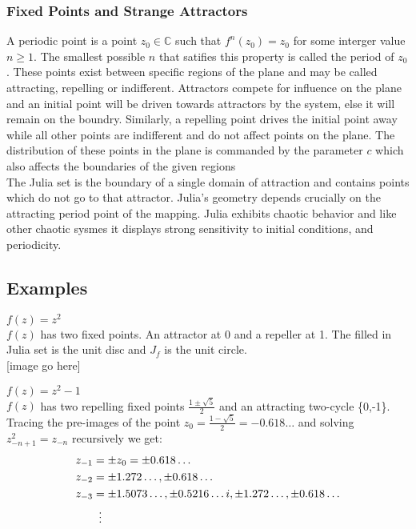 \documentclass[12pt]{article}
\begin{document}
{\subsubsection{Fixed Points and Strange Attractors}
A periodic point is a point $z_0 \in \mathbb{C}$ such that $f^{n}(z_0) = z_0$ for some interger value $n \ge 1$. \cite{tokyo} The smallest possible $n$ that satifies this property is called the period of $z_0$.  These points exist between specific regions of the plane and may be called attracting, repelling or indifferent. \cite{beauty} \cite{tokyo} Attractors compete for influence on the plane and an initial point will be driven towards attractors by the system, else it will remain on the boundry. Similarly, a repelling point drives the initial point away while all other points are indifferent and do not affect points on the plane. The distribution of these points in the plane is commanded by the parameter $c$ which also affects the boundaries of the given regions \cite{beauty}\\

The Julia set is the boundary of a single domain of attraction and contains points which do not go to that attractor. \cite{beauty} Julia's geometry depends crucially on the attracting period point of the mapping. \cite{yang} Julia exhibits chaotic behavior \cite{hypertext} and like other chaotic sysmes \cite{goodwin} it displays strong sensitivity to initial conditions, and periodicity.

\subsection{Examples}

\begin{exmp}
$f(z) = z^{2}$ \cite{Fassett} \cite{yang}	 \\
$f(z)$ has two fixed points. An attractor at 0 and a repeller at 1. 
The filled in Julia set is the unit disc and $J_f$  is the unit circle.\\

[image go here]
\end{exmp}


\begin{exmp}
$f(z) = z^{2}-1$ \cite{yang} \\
$f(z)$ has two repelling fixed points $\frac{1 \pm \sqrt{5} }{2}$ and an attracting two-cycle \{0,-1\}.
Tracing the pre-images of the point $z_0 = \frac{1 - \sqrt{5} }{2} = -0.618 \hdots$ and solving $z^{2}_{-n+1} = z_{-n}$ recursively we get:
\begin{align*}
z_{-1} &= \pm z_0 = \pm 0.618 \hdots \\
z_{-2} &= \pm 1.272 \hdots , \pm 0.618 \hdots\\
z_{-3} &= \pm 1.5073 \hdots, \pm 0.5216\hdots i,  \pm 1.272 \hdots , \pm 0.618 \hdots\\
&\mathrel{\makebox[\widthof{=}]{\vdots}}
\end{align*}


\end{exmp}}
\end{document}
